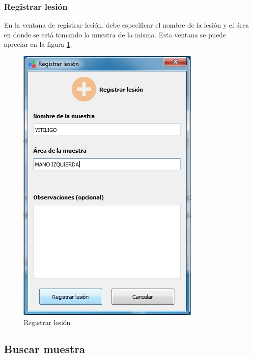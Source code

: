 \subsubsection*{Registrar lesi\'{o}n}
	En la ventana de registrar lesi\'{o}n, debe especificar el nombre de la lesi\'{o}n y el \'{a}rea en donde se est\'{a} tomando la muestra de la misma. Esta ventana se puede apreciar en la figura \ref{fig:registrar-lesion}.
\vfill
\begin{figure}[H]
  \centering
  \includegraphics[width=.6\linewidth]{./img/registrar-lesion.jpg}
\caption[]{Registrar lesi\'{o}n\label{fig:registrar-lesion}}
\end{figure}
\vfill
\newpage
	\subsection*{Buscar muestra}

